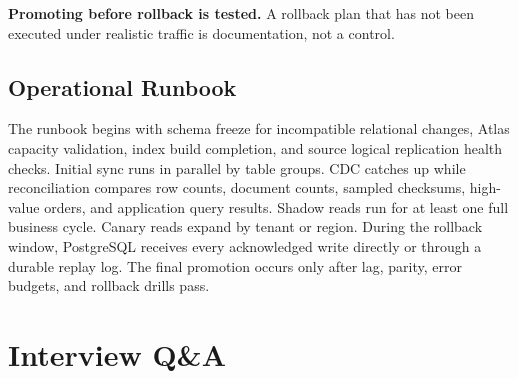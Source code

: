 \begin{pitfall}
\textbf{Promoting before rollback is tested.} A rollback plan that has not been executed under realistic traffic is documentation, not a control.
\end{pitfall}

\subsection{Operational Runbook}
The runbook begins with schema freeze for incompatible relational changes, Atlas capacity validation, index build completion, and source logical replication health checks. Initial sync runs in parallel by table groups. CDC catches up while reconciliation compares row counts, document counts, sampled checksums, high-value orders, and application query results. Shadow reads run for at least one full business cycle. Canary reads expand by tenant or region. During the rollback window, PostgreSQL receives every acknowledged write directly or through a durable replay log. The final promotion occurs only after lag, parity, error budgets, and rollback drills pass.

\section{Interview Q\&A}
